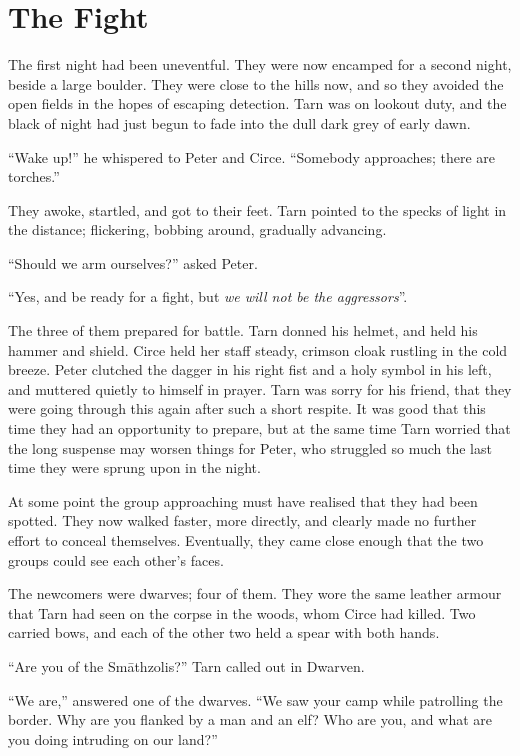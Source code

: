 \chapter{The Fight}

The first night had been uneventful.  They were now encamped for a second night, beside a large boulder.  They were close to the hills now, and so they avoided the open fields in the hopes of escaping detection.  Tarn was on lookout duty, and the black of night had just begun to fade into the dull dark grey of early dawn.

``Wake up!'' he whispered to Peter and Circe.  ``Somebody approaches; there are torches.''

They awoke, startled, and got to their feet.  Tarn pointed to the specks of light in the distance; flickering, bobbing around, gradually advancing.

``Should we arm ourselves?'' asked Peter.

``Yes, and be ready for a fight, but \emph{we will not be the aggressors}''.

The three of them prepared for battle.  Tarn donned his helmet, and held his hammer and shield.  Circe held her staff steady, crimson cloak rustling in the cold breeze.  Peter clutched the dagger in his right fist and a holy symbol in his left, and muttered quietly to himself in prayer.  Tarn was sorry for his friend, that they were going through this again after such a short respite.  It was good that this time they had an opportunity to prepare, but at the same time Tarn worried that the long suspense may worsen things for Peter, who struggled so much the last time they were sprung upon in the night.

At some point the group approaching must have realised that they had been spotted.  They now walked faster, more directly, and clearly made no further effort to conceal themselves.  Eventually, they came close enough that the two groups could see each other's faces.

The newcomers were dwarves; four of them.  They wore the same leather armour that Tarn had seen on the corpse in the woods, whom Circe had killed.  Two carried bows, and each of the other two held a spear with both hands.

``Are you of the Sm\=athzolis?'' Tarn called out in Dwarven.

``We are,'' answered one of the dwarves.  ``We saw your camp while patrolling the border.  Why are you flanked by a man and an elf?  Who are you, and what are you doing intruding on our land?''

